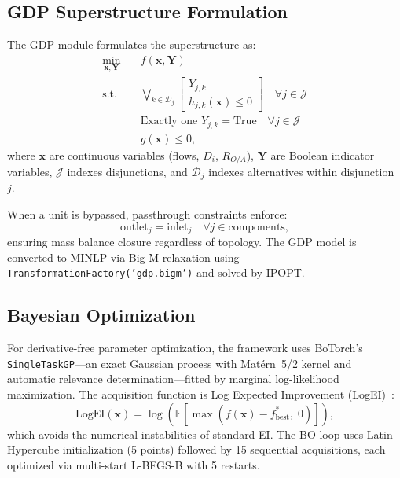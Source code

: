 \documentclass[11pt]{article}
\begin{document}
\subsection{GDP Superstructure Formulation}\label{sec:gdp}

The GDP module formulates the superstructure as:
\begin{subequations}\label{eq:gdp}
\begin{align}
  \min_{\mathbf{x}, \mathbf{Y}} \quad & f(\mathbf{x}, \mathbf{Y}) \\
  \text{s.t.} \quad
    & \bigvee_{k \in \mathcal{D}_j}
      \begin{bmatrix}
        Y_{j,k} \\ h_{j,k}(\mathbf{x}) \leq 0
      \end{bmatrix}
      \quad \forall j \in \mathcal{J} \\
    & \text{Exactly one } Y_{j,k} = \text{True}
      \quad \forall j \in \mathcal{J} \\
    & g(\mathbf{x}) \leq 0,
\end{align}
\end{subequations}
where $\mathbf{x}$ are continuous variables (flows, $D_i$, $R_{O/A}$),
$\mathbf{Y}$ are Boolean indicator variables, $\mathcal{J}$ indexes
disjunctions, and $\mathcal{D}_j$ indexes alternatives within
disjunction~$j$.

When a unit is bypassed, passthrough constraints enforce:
\begin{equation}
  \text{outlet}_j = \text{inlet}_j \quad \forall j \in \text{components},
\end{equation}
ensuring mass balance closure regardless of topology.  The GDP model is
converted to MINLP via Big-M relaxation using
\texttt{TransformationFactory('gdp.bigm')} and solved by IPOPT.


\subsection{Bayesian Optimization}

For derivative-free parameter optimization, the framework uses
BoTorch's \texttt{SingleTaskGP}---an exact Gaussian process with
Mat\'ern~5/2 kernel and automatic relevance determination---fitted
by marginal log-likelihood maximization.  The acquisition function is
Log Expected Improvement (LogEI)~\citep{ament2024logei}:
\begin{equation}
  \text{LogEI}(\mathbf{x}) = \log\!\left(
    \mathbb{E}\!\left[\max\!\left(
      f(\mathbf{x}) - f^*_{\text{best}},\; 0
    \right)\right]
  \right),
\end{equation}
which avoids the numerical instabilities of standard EI.  The BO loop
uses Latin Hypercube initialization (5 points) followed by 15 sequential
acquisitions, each optimized via multi-start L-BFGS-B with 5 restarts.
\end{document}
